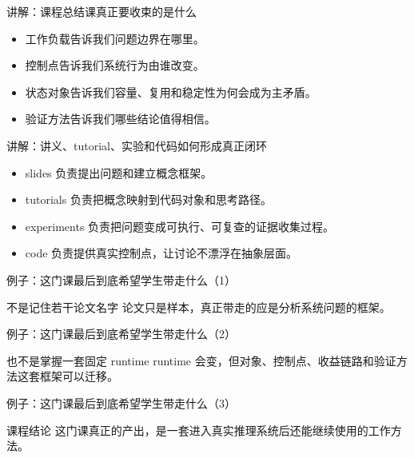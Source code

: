 \begin{frame}{讲解：课程总结课真正要收束的是什么}
  \begin{itemize}
    \item 工作负载告诉我们问题边界在哪里。
    \item 控制点告诉我们系统行为由谁改变。
    \item 状态对象告诉我们容量、复用和稳定性为何会成为主矛盾。
    \item 验证方法告诉我们哪些结论值得相信。
  \end{itemize}
\end{frame}

\begin{frame}{讲解：讲义、tutorial、实验和代码如何形成真正闭环}
  \begin{itemize}
    \item slides 负责提出问题和建立概念框架。
    \item tutorials 负责把概念映射到代码对象和思考路径。
    \item experiments 负责把问题变成可执行、可复查的证据收集过程。
    \item code 负责提供真实控制点，让讨论不漂浮在抽象层面。
  \end{itemize}
\end{frame}

\begin{frame}{例子：这门课最后到底希望学生带走什么（1）}
\begin{block}{不是记住若干论文名字}
    论文只是样本，真正带走的应是分析系统问题的框架。
  \end{block}
\end{frame}

\begin{frame}{例子：这门课最后到底希望学生带走什么（2）}
\begin{block}{也不是掌握一套固定 runtime}
    runtime 会变，但对象、控制点、收益链路和验证方法这套框架可以迁移。
  \end{block}
\end{frame}

\begin{frame}{例子：这门课最后到底希望学生带走什么（3）}
\begin{block}{课程结论}
    这门课真正的产出，是一套进入真实推理系统后还能继续使用的工作方法。
  \end{block}
\end{frame}

